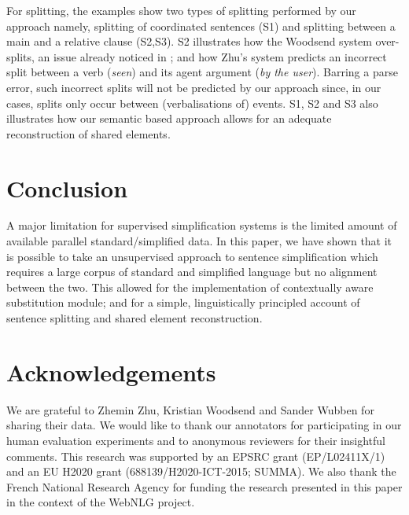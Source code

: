 \documentclass[11pt,a4paper]{article}
\newcommand{\nlang}[1]{{\it #1}}
\begin{document}
For splitting, the examples show two types of splitting performed by
our approach namely, splitting of coordinated sentences (S1) and
splitting between a main and a relative clause (S2,S3). S2 illustrates
how the Woodsend system over-splits, an issue already noticed in
\cite{siddharthan-mandya:2014:EACL}; and how Zhu's system predicts an
incorrect split between a verb (\nlang{seen}) and its agent argument
(\nlang{by the user}). Barring a parse error, such incorrect splits
will not be predicted by our approach since, in our cases, splits only
occur between (verbalisations of) events. S1, S2 and S3 also
illustrates how our semantic based approach allows for an adequate
reconstruction of shared elements.

\vspace{-0.1cm}
\section{Conclusion}
\label{sec:conclusion}

A major limitation for supervised simplification systems is the
limited amount of available parallel standard/simplified data.  In
this paper, we have shown that it is possible to take an unsupervised
approach to sentence simplification which requires a large corpus of
standard and simplified language but no alignment between the
two. This allowed for the implementation of contextually aware
substitution module; and for a simple, linguistically principled
account of sentence splitting and shared element reconstruction. 

\section{Acknowledgements}

We are grateful to Zhemin Zhu, Kristian Woodsend and Sander Wubben for
sharing their data.  We would like to thank our annotators for
participating in our human evaluation experiments and to anonymous
reviewers for their insightful comments. This research was supported
by an EPSRC grant (EP/L02411X/1) and an EU H2020 grant
(688139/H2020-ICT-2015; SUMMA). We also thank the French National
Research Agency for funding the research presented in this paper in
the context of the WebNLG project.











\end{document}

